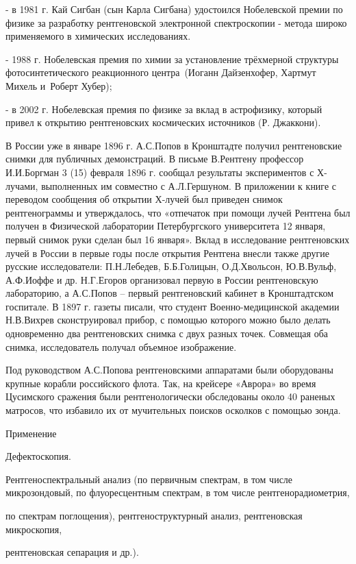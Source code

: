 \documentclass[a4paper,14pt, openany, twoside, draft]{extbook} %
\begin{document}
{}- в 1981 г. Кай Сигбан (сын Карла Сигбана) удостоился Нобелевской премии по физике за разработку рентгеновской электронной спектроскопии - метода широко применяемого в химических исследованиях.

{}- 1988 г. Нобелевская премия по химии за установление трёхмерной структуры фотосинтетического реакционного центра~(Иоганн Дайзенхофер, Хартмут Михель и~Роберт Хубер);

{}- в 2002 г. Нобелевская премия по физике за вклад в астрофизику, который привел к открытию рентгеновских космических источников (Р. Джаккони).

В России уже в январе 1896 г. А.С.Попов в Кронштадте получил рентгеновские снимки для публичных демонстраций. В письме В.Рентгену профессор И.И.Боргман 3 (15) февраля 1896 г. сообщал результаты экспериментов с Х-лучами, выполненных им совместно с А.Л.Гершуном. В приложении к книге с переводом сообщения об открытии Х-лучей был приведен снимок рентгенограммы и утверждалось, что «отпечаток при помощи лучей Рентгена был получен в Физической лаборатории Петербургского университета 12 января, первый снимок руки сделан был 16 января». Вклад в исследование рентгеновских лучей в России в первые годы после открытия Рентгена внесли также другие русские исследователи: П.Н.Лебедев, Б.Б.Голицын, О.Д.Хвольсон, Ю.В.Вульф, А.Ф.Иоффе и др. Н.Г.Егоров организовал первую в России рентгеновскую лабораторию, а А.С.Попов – первый рентгеновский кабинет в Кронштадтском госпитале. В 1897 г. газеты писали, что студент Военно-медицинской академии Н.В.Вихрев сконструировал прибор, с помощью которого можно было делать одновременно два рентгеновских снимка с двух разных точек. Совмещая оба снимка, исследователь получал объемное изображение.

Под руководством А.С.Попова рентгеновскими аппаратами были оборудованы крупные корабли российского флота. Так, на крейсере «Аврора» во время Цусимского сражения были рентгенологически обследованы около 40 раненых матросов, что избавило их от мучительных поисков осколков с помощью зонда.

Применение

Дефектоскопия.

Рентгеноспектральный анализ (по первичным спектрам, в том числе микрозондовый, по флуоресцентным спектрам, в том числе рентгенорадиометрия,

по спектрам поглощения), рентгеноструктурный анализ, рентгеновская микроскопия,

рентгеновская сепарация и др.).
\end{document}
